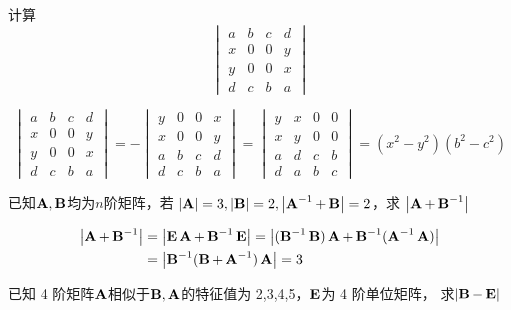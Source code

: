 \documentclass{article}
\begin{document}
\begin{examplle}[]
计算
\begin{equation*}
\begin{vmatrix}
a&b&c&d\\x&0&0&y\\
y&0&0&x\\d&c&b&a
\end{vmatrix}
\end{equation*}

\begin{equation*}
\begin{vmatrix}
a&b&c&d\\x&0&0&y\\
y&0&0&x\\d&c&b&a
\end{vmatrix}=-
\begin{vmatrix}
y&0&0&x\\x&0&0&y\\a&b&c&d\\d&c&b&a
\end{vmatrix}=
\begin{vmatrix}
y&x&0&0\\x&y&0&0\\
a&d&c&b\\d&a&b&c
\end{vmatrix}=(x^2-y^2)(b^2-c^2)
\end{equation*}
\end{examplle}

\begin{examplle}[]
已知\(\operatorname{\textbf{A}},\operatorname{\textbf{B}}\)均为\(n\)阶矩阵，若
\(\abs{\bA}=3,\abs{\bB}=2,\abs{\bA^{-1}+\bB}=2\)，求
\(\abs{\bA+\bB^{-1}}\)

\begin{align*}
\abs{\bA+\bB^{-1}}&=\abs{\bE\bA+\bB^{-1}\bE}=\abs{(\bB^{-1}\bB)\bA+\bB^{-1}(\bA^{-1}\bA)}\\
&=\abs{\bB^{-1}(\bB+\bA^{-1})\bA}=3
\end{align*}
\end{examplle}

\begin{examplle}[]
已知 4 阶矩阵\(\operatorname{\textbf{A}}\)相似于\(\operatorname{\textbf{B}},\operatorname{\textbf{A}}\)的特征值为 2,3,4,5，\(\operatorname{\textbf{E}}\)为 4 阶单位矩阵，
求\(\abs{\bB-\bE}\)
\end{examplle}
\end{document}
